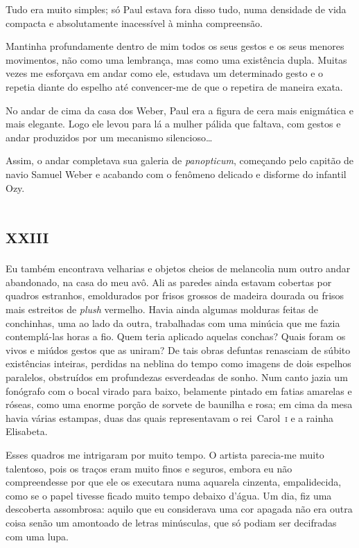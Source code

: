 Tudo era muito simples; só Paul estava fora disso tudo, numa densidade de vida compacta e absolutamente inacessível à minha compreensão.

Mantinha profundamente dentro de mim todos os seus gestos e os seus menores movimentos, não como uma lembrança, mas como uma existência dupla. Muitas vezes me esforçava em andar como ele, estudava um determinado gesto e o repetia diante do espelho até convencer-me de que o repetira de maneira exata.

No andar de cima da casa dos Weber, Paul era a figura de cera mais enigmática e mais elegante. Logo ele levou para lá a mulher pálida que faltava, com gestos e andar produzidos por um mecanismo silencioso\ldots{}

Assim, o andar completava sua galeria de \textit{panopticum}, começando pelo capitão de navio Samuel Weber e acabando com o fenômeno delicado e disforme do infantil Ozy.


\chapter*{\huge\centering\textsc{xxiii}}

Eu também encontrava velharias e objetos cheios de melancolia num outro andar abandonado, na casa do meu avô. Ali as paredes ainda estavam cobertas por quadros estranhos, emoldurados por frisos grossos de madeira dourada ou frisos mais estreitos de \textit{plush} vermelho. Havia ainda algumas molduras feitas de conchinhas, uma ao lado da outra, trabalhadas com uma minúcia que me fazia contemplá-las horas a fio. Quem teria aplicado aquelas conchas? Quais foram os vivos e miúdos gestos que as uniram? De tais obras defuntas renasciam de súbito existências inteiras, perdidas na neblina do tempo como imagens de dois espelhos paralelos, obstruídos em profundezas esverdeadas de sonho.
Num canto jazia um fonógrafo com o bocal virado para baixo, belamente pintado em fatias amarelas e róseas, como uma enorme porção de sorvete de baunilha e rosa; em cima da mesa havia várias estampas, duas das quais representavam o rei~Carol~\textsc{i} e a rainha Elisabeta.

Esses quadros me intrigaram por muito tempo. O artista parecia-me muito talentoso, pois os traços eram muito finos e seguros, embora eu não compreendesse por que ele os executara numa aquarela cinzenta, empalidecida, como se o papel tivesse ficado muito tempo debaixo d'água.
Um dia, fiz uma descoberta assombrosa: aquilo que eu considerava uma cor apagada não era outra coisa senão um amontoado de letras minúsculas, que só podiam ser decifradas com uma lupa.


